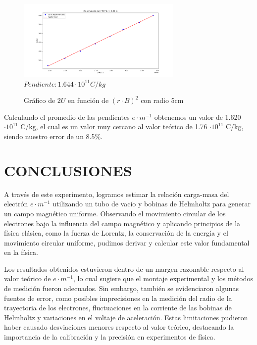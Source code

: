 \documentclass[a4paper]{article}
\begin{document}
    \begin{figure}[h!]
        \vspace{-2mm}
        \centering
        \includegraphics[width = 8cm] {../imagenes/radio5.png}
        \textbf{$Pendiente: 1.644 \cdot 10^{11} C/kg$}
        \caption{Gráfico de $2U$ en función de $(r \cdot B)^2$ con radio 5cm}
        \vspace{-5mm}
    \end{figure}

    \newpage
    \noindent
    \thispagestyle{fancy}

    \indent Calculando el promedio de las pendientes $e \cdot m^{-1}$ obtenemos un valor de 1.620 $\cdot 10^{11}$ C/kg, el cual es un valor muy cercano al valor teórico de 1.76 $\cdot 10^{11}$ C/kg, siendo nuestro error de un 8.5\%.


\section{CONCLUSIONES}

    \indent A través de este experimento, logramos estimar la relación carga-masa del electrón $e \cdot m^{-1}$ utilizando un tubo de vacío y bobinas de Helmholtz para generar un campo magnético uniforme. Observando el movimiento circular de los electrones bajo la influencia del campo magnético y aplicando principios de la física clásica, como la fuerza de Lorentz, la conservación de la energía y el movimiento circular uniforme, pudimos derivar y calcular este valor fundamental en la física.

    Los resultados obtenidos estuvieron dentro de un margen razonable respecto al valor teórico de $e \cdot m^{-1}$, lo cual sugiere que el montaje experimental y los métodos de medición fueron adecuados. Sin embargo, también se evidenciaron algunas fuentes de error, como posibles imprecisiones en la medición del radio de la trayectoria de los electrones, fluctuaciones en la corriente de las bobinas de Helmholtz y variaciones en el voltaje de aceleración. Estas limitaciones pudieron haber causado desviaciones menores respecto al valor teórico, destacando la importancia de la calibración y la precisión en experimentos de física.
\end{document}
